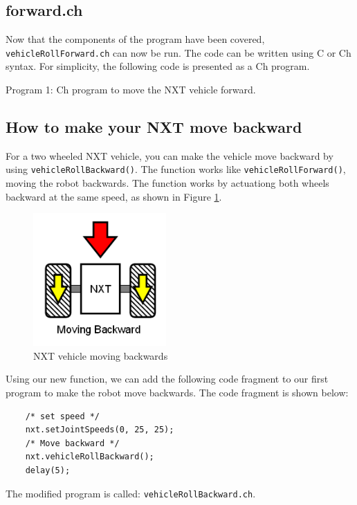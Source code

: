 \subsection{forward.ch}
Now that the components of the program have been covered, \verb+vehicleRollForward.ch+ can now be run.
The code can be written using C or Ch syntax. For simplicity, the following code is presented as a Ch
program.


\begin{center}
Program 1: Ch program to move the NXT vehicle forward.
\end{center}

\subsection{How to make your NXT move backward}
For a two wheeled NXT vehicle, you can make the vehicle move backward by using \verb+vehicleRollBackward()+. 
The function works like \verb+vehicleRollForward()+, moving the robot backwards. The function 
works by actuationg both wheels backward at the same speed, as shown in Figure \ref{fig_NXT_backward}.
\begin{figure}[h]
  \begin{center}
    \includegraphics[height=2in]{figure/mindstorm/Vehicle_back.png}
    \caption{NXT vehicle moving backwards\label{fig_NXT_backward}}
  \end{center}
\end{figure}
Using our new function, we can add the following code fragment to our first program to make the robot
move backwards. The code fragment is shown below:
\begin{verbatim}
    /* set speed */
    nxt.setJointSpeeds(0, 25, 25);
    /* Move backward */
    nxt.vehicleRollBackward();
    delay(5);
\end{verbatim}
\noindent
The modified program is called: \verb+vehicleRollBackward.ch+.

